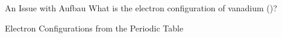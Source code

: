 \documentclass[notes=only]{beamer}
\begin{document}
\begin{frame}[t]{An Issue with Aufbau}
	What is the electron configuration of vanadium ()?
\end{frame}

%

\begin{frame}{Electron Configurations from the Periodic Table}
\end{frame}
\end{document}
